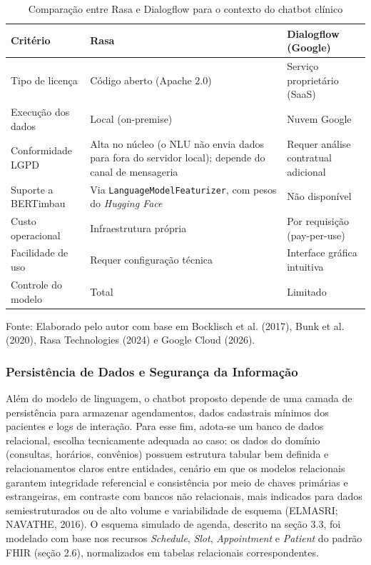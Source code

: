 \documentclass[12pt,a4paper]{extarticle}
\begin{document}
\begin{table}[H]
\centering
\caption{Comparação entre Rasa e Dialogflow para o contexto do chatbot clínico}
\label{tab:rasa-dialogflow}
\begin{tabular}{p{3.8cm}p{5.0cm}p{5.0cm}}
\hline
\textbf{Critério} & \textbf{Rasa} & \textbf{Dialogflow (Google)} \\
\hline
Tipo de licença & Código aberto (Apache 2.0) & Serviço proprietário (SaaS) \\
Execução dos dados & Local (on-premise) & Nuvem Google \\
Conformidade LGPD & Alta no núcleo (o NLU não envia dados para fora do servidor local); depende do canal de mensageria & Requer análise contratual adicional \\
Suporte a BERTimbau & Via \texttt{LanguageModel\allowbreak{}Featurizer}, com pesos do \textit{Hugging Face} & Não disponível \\
Custo operacional & Infraestrutura própria & Por requisição (pay-per-use) \\
Facilidade de uso & Requer configuração técnica & Interface gráfica intuitiva \\
Controle do modelo & Total & Limitado \\
\hline
\end{tabular}
\vspace{0.3cm}

\footnotesize{Fonte: Elaborado pelo autor com base em Bocklisch et al. (2017), Bunk et al. (2020), Rasa Technologies (2024) e Google Cloud (2026).}
\end{table}

\subsubsection{Persistência de Dados e Segurança da Informação}
\label{sec:persistencia}

Além do modelo de linguagem, o chatbot proposto depende de uma camada de persistência para armazenar agendamentos, dados cadastrais mínimos dos pacientes e logs de interação. Para esse fim, adota-se um banco de dados relacional, escolha tecnicamente adequada ao caso: os dados do domínio (consultas, horários, convênios) possuem estrutura tabular bem definida e relacionamentos claros entre entidades, cenário em que os modelos relacionais garantem integridade referencial e consistência por meio de chaves primárias e estrangeiras, em contraste com bancos não relacionais, mais indicados para dados semiestruturados ou de alto volume e variabilidade de esquema (ELMASRI; NAVATHE, 2016). O esquema simulado de agenda, descrito na seção 3.3, foi modelado com base nos recursos \textit{Schedule}, \textit{Slot}, \textit{Appointment} e \textit{Patient} do padrão FHIR (seção 2.6), normalizados em tabelas relacionais correspondentes.
\end{document}
